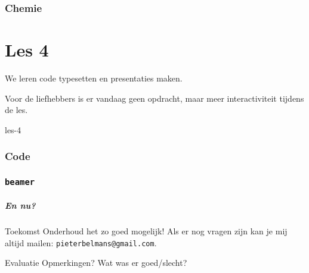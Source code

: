 \documentclass{beamer}
\begin{document}
\section{Chemie}



\part{Les 4}
\lecture
{We leren code typesetten en presentaties maken.

Voor de liefhebbers is er vandaag geen opdracht, maar meer interactiviteit tijdens de les.}
{les-4}
\section{Code}

\section{\texttt{beamer}}


\begin{frame}
  \frametitle{En nu?}

  \begin{exampleblock}{Toekomst}
    Onderhoud het zo goed mogelijk! Als er nog vragen zijn kan je mij altijd mailen: \texttt{pieterbelmans@gmail.com}.
    
  \end{exampleblock}
  \pause
  
  \begin{exampleblock}{Evaluatie}
    Opmerkingen? Wat was er goed/slecht?
  \end{exampleblock}
\end{frame}
\end{document}
